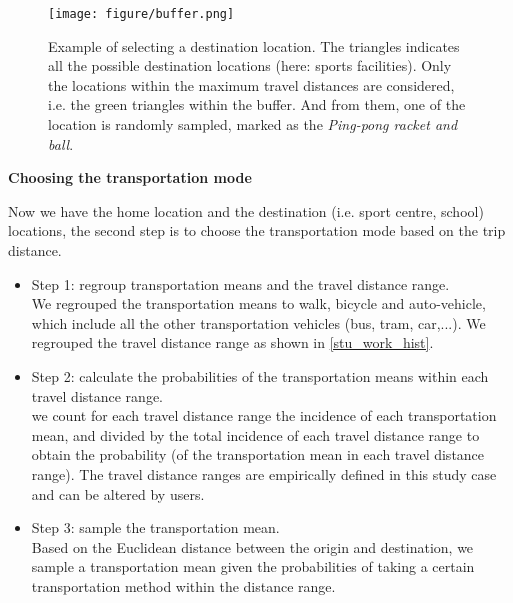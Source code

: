\documentclass[]{article}
\begin{document}
\begin{figure}[!h]
    \centering
    \texttt{[image: figure/buffer.png]}
    \caption{Example of selecting a destination location. The triangles indicates all the possible destination locations (here: sports facilities). Only the locations within the maximum travel distances are considered, i.e. the green triangles within the buffer. And from them, one of the location is randomly sampled, marked as the \textit{Ping-pong racket and ball}. }
    \label{buffer}
\end{figure} 



\textbf{Choosing the transportation mode}

Now we have the home location and the destination (i.e. sport centre, school) locations, the second step is to choose the transportation mode based on the trip distance. 

\begin{itemize}
    \item Step 1: regroup transportation means and the travel distance range. \\ We regrouped the transportation means to walk, bicycle and auto-vehicle, which include all the other transportation vehicles (bus, tram, car,...). We regrouped the travel distance range as shown in \cref{stu_work_hist}. 
    
    \item Step 2: calculate the probabilities of the transportation means within each travel distance range. \\ we count for each travel distance range the incidence of each transportation mean, and divided by the total incidence of each travel distance range to obtain the probability (of the transportation mean in each travel distance range). The travel distance ranges are empirically defined in this study case and can be altered by users. 
    
    \item Step 3: sample the transportation mean. \\ 
    Based on the %
    Euclidean distance between the origin and destination, we sample a transportation mean given the probabilities of taking a certain transportation method within the distance range.   
    
\end{itemize}
\end{document}
